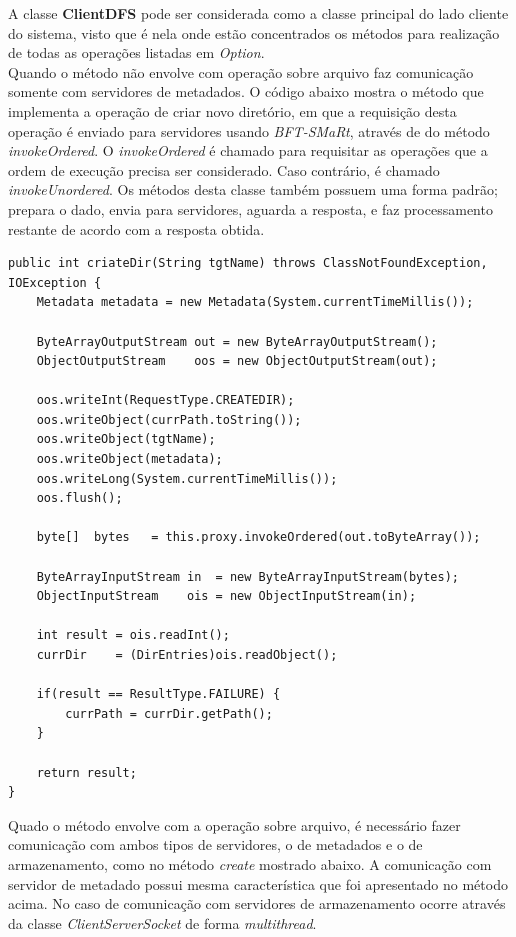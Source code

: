 A classe \textbf{ClientDFS} pode ser considerada como a classe principal do lado cliente do sistema, visto que é nela onde estão concentrados os métodos para realização de todas as operações listadas em \textit{Option}.
\\
Quando o método não envolve com operação sobre arquivo faz comunicação somente com servidores de metadados.
O código abaixo mostra o método que implementa a operação de criar novo diretório, em que a requisição desta operação é enviado para servidores usando \textit{BFT-SMaRt}, através de do método \textit{invokeOrdered}.
O \textit{invokeOrdered} é chamado para requisitar as operações que a ordem de execução precisa ser considerado. Caso contrário, é chamado  \textit{invokeUnordered}.
Os métodos desta classe também possuem uma forma padrão; prepara o dado, envia para servidores, aguarda a resposta, e faz processamento restante de acordo com a resposta obtida.  
\begin{lstlisting}[basicstyle=\ttfamily\footnotesize, frame=single]	
public int criateDir(String tgtName) throws ClassNotFoundException, IOException {
	Metadata metadata = new Metadata(System.currentTimeMillis());
	
	ByteArrayOutputStream out = new ByteArrayOutputStream();
	ObjectOutputStream    oos = new ObjectOutputStream(out);
	
	oos.writeInt(RequestType.CREATEDIR);
	oos.writeObject(currPath.toString());
	oos.writeObject(tgtName);
	oos.writeObject(metadata);
	oos.writeLong(System.currentTimeMillis());
	oos.flush();
	
	byte[]  bytes   = this.proxy.invokeOrdered(out.toByteArray());
	
	ByteArrayInputStream in  = new ByteArrayInputStream(bytes);
	ObjectInputStream    ois = new ObjectInputStream(in);
	
	int result = ois.readInt();
	currDir    = (DirEntries)ois.readObject();
	
	if(result == ResultType.FAILURE) {
		currPath = currDir.getPath();
	}
	
	return result;
}
\end{lstlisting}
Quado o método envolve com a operação sobre arquivo, é necessário fazer comunicação com ambos tipos de servidores, o de metadados e o de armazenamento, como no método \textit{create} mostrado abaixo.
A comunicação com servidor de metadado possui mesma característica que foi apresentado no método acima.
No caso de comunicação com servidores de armazenamento ocorre através da classe \textit{ClientServerSocket} de forma \textit{multithread}.
